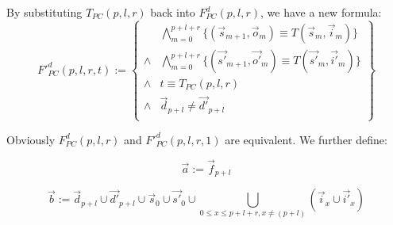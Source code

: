 By substituting $T_{PC}(p,l,r)$ back into $F^d_{PC}(p,l,r)$,
we have a new formula:
\begin{equation}\label{fpcq}
F'^d_{PC}(p,l,r,t):=
\left\{
\begin{array}{cc}
&\bigwedge_{m=0}^{p+l+r}
\{
(\vec{s}_{m+1},\vec{o}_m)\equiv T(\vec{s}_m,\vec{i}_m)
\}
\\
\wedge&\bigwedge_{m=0}^{p+l+r}
\{
(\vec{s'}_{m+1},\vec{o'}_m)\equiv T(\vec{s'}_m,\vec{i'}_m)
\}
\\
\wedge& t\equiv T_{PC}(p,l,r)\\
\wedge& \vec{d}_{p+l}\ne \vec{d'}_{p+l} \\
\end{array}
\right\}
\end{equation}


Obviously $F^d_{PC}(p,l,r)$ and $F'^d_{PC}(p,l,r,1)$ are equivalent.
We further define:

%


\begin{equation}\label{pcdef1}
\vec{a}:=\vec{f}_{p+l}
\end{equation}

\begin{equation}\label{pcdef2}
\vec{b}:=\vec{d}_{p+l}\cup \vec{d'}_{p+l}\cup \vec{s}_0\cup \vec{s'}_0\cup\bigcup_{0\le x\le p+l+r,x\neq (p+l)}(\vec{i}_{x}\cup\vec{i'}_{x})
\end{equation}

